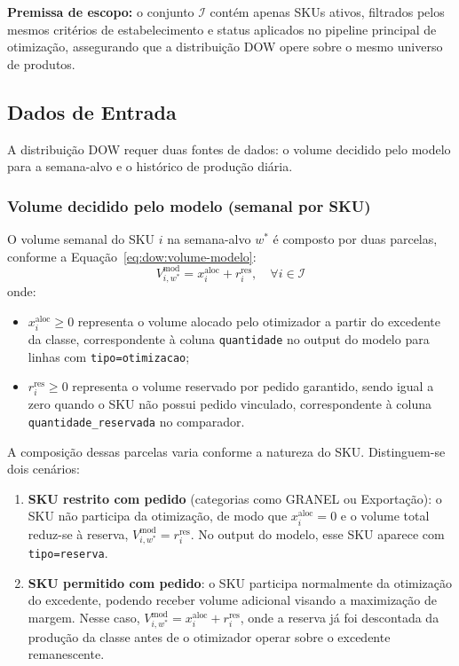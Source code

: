 \documentclass[11pt,a4paper]{article}
\begin{document}
\textbf{Premissa de escopo:} o conjunto $\mathcal{I}$ contém apenas SKUs ativos,
filtrados pelos mesmos critérios de estabelecimento e status aplicados no
pipeline principal de otimização, assegurando que a distribuição DOW opere
sobre o mesmo universo de produtos.

\subsection{Dados de Entrada}

A distribuição DOW requer duas fontes de dados: o volume decidido pelo modelo
para a semana-alvo e o histórico de produção diária.

\subsubsection{Volume decidido pelo modelo (semanal por SKU)}

O volume semanal do SKU $i$ na semana-alvo $w^*$ é composto por duas parcelas,
conforme a Equação~\eqref{eq:dow:volume-modelo}:
\begin{equation}\label{eq:dow:volume-modelo}
V^{\text{mod}}_{i,w^*} = x_i^{\text{aloc}} + r_i^{\text{res}},
\quad \forall i \in \mathcal{I}
\end{equation}
onde:
\begin{itemize}
    \item $x_i^{\text{aloc}} \geq 0$ representa o volume alocado pelo otimizador
        a partir do excedente da classe, correspondente à coluna
        \texttt{quantidade} no output do modelo para linhas com
        \texttt{tipo=otimizacao};
    \item $r_i^{\text{res}} \geq 0$ representa o volume reservado por pedido
        garantido, sendo igual a zero quando o SKU não possui pedido vinculado,
        correspondente à coluna \texttt{quantidade\_reservada} no comparador.
\end{itemize}

A composição dessas parcelas varia conforme a natureza do SKU. Distinguem-se
dois cenários:
\begin{enumerate}
    \item \textbf{SKU restrito com pedido} (categorias como GRANEL ou
        Exportação): o SKU não participa da otimização, de modo que
        $x_i^{\text{aloc}}=0$ e o volume total reduz-se à reserva,
        $V^{\text{mod}}_{i,w^*}=r_i^{\text{res}}$. No output do modelo,
        esse SKU aparece com \texttt{tipo=reserva}.
    \item \textbf{SKU permitido com pedido}: o SKU participa normalmente da
        otimização do excedente, podendo receber volume adicional visando a
        maximização de margem. Nesse caso,
        $V^{\text{mod}}_{i,w^*}=x_i^{\text{aloc}}+r_i^{\text{res}}$, onde a
        reserva já foi descontada da produção da classe antes de o otimizador
        operar sobre o excedente remanescente.
\end{enumerate}
\end{document}
